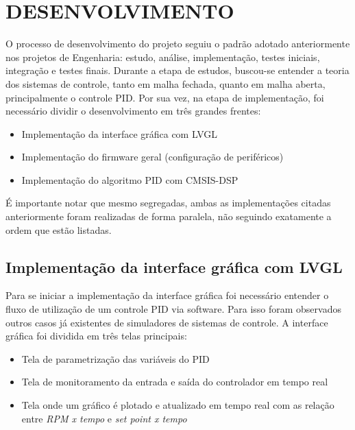 \documentclass[times, twoside, watermark]{artigo}
\begin{document}

\section*{DESENVOLVIMENTO}
\setcounter{section}{-1}
O processo de desenvolvimento do projeto seguiu o padrão adotado anteriormente nos projetos de Engenharia: estudo, análise, implementação, testes iniciais, integração e testes finais.\newline
Durante a etapa de estudos, buscou-se entender a teoria dos sistemas de controle, tanto em malha fechada, quanto em malha aberta, principalmente o controle PID. \newline
Por sua vez, na etapa de implementação, foi necessário dividir o desenvolvimento em três grandes frentes:
\begin{itemize}
    \item Implementação da interface gráfica com LVGL
    \item Implementação do firmware geral (configuração de periféricos)
    \item Implementação do algoritmo PID com CMSIS-DSP
\end{itemize}

É importante notar que mesmo segregadas, ambas as implementações citadas anteriormente foram realizadas de forma paralela, não seguindo exatamente a ordem que estão listadas.

\subsection{Implementação da interface gráfica com LVGL}
Para se iniciar a implementação da interface gráfica foi necessário entender o fluxo de utilização de um controle PID via software. Para isso foram observados outros casos já existentes de simuladores de sistemas de controle.
A interface gráfica foi dividida em três telas principais:
\begin{itemize}
    \item Tela de parametrização das variáveis do PID
    \item Tela de monitoramento da entrada e saída do controlador em tempo real
    \item Tela onde um gráfico é plotado e atualizado em tempo real com as relação entre \textit{RPM x tempo} e \textit{set point x tempo}
\end{itemize}
\end{document}
